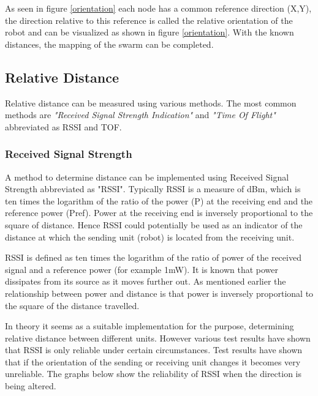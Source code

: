 \documentclass[10pt,a4paper]{article}
\begin{document}
As seen in figure \ref{orientation} each node has a common reference direction (X,Y), the direction relative to this reference is called the relative orientation of the robot and can be visualized as shown in figure \ref{orientation}. With the known distances, the mapping of the swarm can be completed.
\newpage

\subsection{Relative Distance}
Relative distance can be measured using various methods. The most common methods are \textit{"Received Signal Strength Indication"} and \textit{"Time Of Flight"} abbreviated as RSSI and TOF. 

\subsubsection{Received Signal Strength}
A method to determine distance can be implemented using Received Signal Strength abbreviated as "RSSI". Typically RSSI is a measure of dBm, which is ten times the logarithm of the ratio of the power (P) at the receiving end and the reference power (Pref). Power at the receiving end is inversely proportional to the square of distance.\cite{RSSI} Hence RSSI could potentially be used as an indicator of the distance at which the sending unit (robot) is located from the receiving unit.\cite{RSSI}

RSSI is defined as ten times the logarithm of the ratio of power of the received signal and a reference power (for example 1mW). It is known that power dissipates from its source as it moves further out. As mentioned earlier the relationship between power and distance is that power is inversely proportional to the square of the distance travelled. \cite{RSSI}

In theory it seems as a suitable implementation for the purpose, determining relative distance between different units. However various test results have shown that RSSI is only reliable under certain circumstances. Test results have shown that if the orientation of the sending or receiving unit changes it becomes very unreliable. The graphs below show the reliability of RSSI when the direction is being altered.\cite{RSSI}
\end{document}
